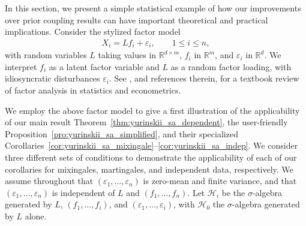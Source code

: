 \documentclass[11pt,lof]{puthesis}
\newcommand{\R}{\ensuremath{\mathbb{R}}}
\newcommand{\cH}{\ensuremath{\mathcal{H}}}
\theoremstyle{break}
\theoremstyle{proof}
\begin{document}
In this section, we present a simple statistical example of how our
improvements over prior coupling results can have important theoretical and
practical implications. Consider the stylized factor model
%
\begin{align*}
  X_i = L f_i + \varepsilon_i, \qquad 1 \leq i \leq n,
\end{align*}
%
with random variables $L$ taking values in $\R^{d \times m}$, $f_i$ in $\R^m$,
and $\varepsilon_i$ in $\R^d$. We interpret $f_i$ as a latent factor variable
and $L$ as a random factor loading, with idiosyncratic disturbances
$\varepsilon_i$. See \citet{fan2020statistical}, and references therein, for a
textbook review of factor analysis in statistics and econometrics.

We employ the above factor model to give a first illustration of the
applicability of our main result Theorem~\ref{thm:yurinskii_sa_dependent}, the
user-friendly Proposition~\ref{pro:yurinskii_sa_simplified}, and their
specialized
Corollaries~\ref{cor:yurinskii_sa_mixingale}--\ref{cor:yurinskii_sa_indep}. We
consider three different sets of conditions to demonstrate the applicability of
each of our corollaries for mixingales, martingales, and independent data,
respectively. We assume throughout that
$(\varepsilon_1, \ldots, \varepsilon_n)$ is zero-mean and finite variance, and
that $(\varepsilon_1, \ldots, \varepsilon_n)$ is independent
of $L$ and $(f_1, \ldots, f_n)$. Let $\cH_i$ be the $\sigma$-algebra generated
by $L$, $(f_1, \ldots, f_i)$, and $(\varepsilon_1, \ldots, \varepsilon_i)$, with
$\cH_0$ the $\sigma$-algebra generated by $L$ alone.
\end{document}
